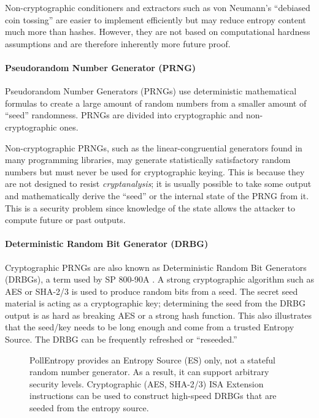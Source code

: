     Non-cryptographic conditioners and extractors such as von Neumann's
    ``debiased coin tossing'' \cite{Ne51} are easier to implement
    efficiently but may reduce entropy content much more than hashes.
    However, they are not based on computational hardness assumptions and
    are therefore inherently more future proof.

    \paragraph{Pseudorandom Number Generator (PRNG)}
    \label{sec:intro-prng}
    Pseudorandom Number Generators (PRNGs) use deterministic mathematical
    formulas to create a large amount of random numbers from a smaller
    amount of ``seed'' randomness. PRNGs are divided into cryptographic and
    non-cryptographic ones.

    Non-cryptographic PRNGs, such as the linear-congruential generators
    found in many programming libraries, may generate statistically
    satisfactory random numbers but must never be used for cryptographic
    keying. This is because they are not designed to resist
    \emph{cryptanalysis}; it is usually possible to take some output and
    mathematically derive the ``seed'' or the internal state  of the PRNG
    from it. This is a security problem since knowledge of the state
    allows the attacker to compute future or past outputs.

    \paragraph{Deterministic Random Bit Generator (DRBG)}
    \label{sec:intro-drbg}
    Cryptographic PRNGs are also known as Deterministic Random Bit
    Generators (DRBGs), a term used by SP 800-90A \cite{BaKe15}. A strong
    cryptographic algorithm such as AES \cite{NI01} or SHA-2/3
    \cite{NI15,NI15A} is used to produce random bits from a seed. The secret
    seed material is acting as a cryptographic key; determining the seed
    from the DRBG output is as hard as breaking AES or a strong hash function.
    This also illustrates that the seed/key needs to be long enough and
    come from a trusted Entropy Source. The DRBG can be frequently
    refreshed or ``reseeded.''


\begin{figure}[tb]
    \centering
    
    \caption{PollEntropy provides an Entropy Source (ES) only, not a stateful
        random number generator. As a result, it can support arbitrary
        security levels. Cryptographic (AES, SHA-2/3) ISA Extension
        instructions can be used to construct high-speed DRBGs that are
        seeded from the entropy source.}
    \label{fig:rng_tikz}
\end{figure}

